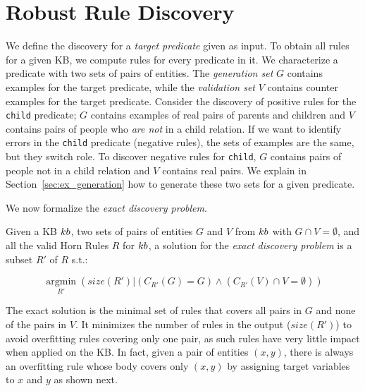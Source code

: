 \section{Robust Rule Discovery} \label{sec:problem}
We define the discovery for a {\em target predicate} given as input. 
To obtain all rules for a given KB, %
we compute rules for every predicate in it. %
We characterize a predicate with two sets of pairs of entities.
%
The \emph{generation set} $G$ contains examples for the target predicate, 
while the \emph{validation set} $V$ contains counter examples for the target predicate.
Consider the discovery of positive rules for the {\tt child} predicate; $G$ contains examples of real pairs of parents and children and $V$ contains pairs of people who {\em are not} in a child relation. If we want to identify errors in the {\tt child} predicate (negative rules), the sets of examples are the same, but they switch role. To discover negative rules for {\tt child}, $G$ contains pairs of people not in a child relation and $V$ contains real pairs.
We explain in Section~\ref{sec:ex_generation} how to generate these two sets for a given predicate. 

We now formalize the \emph{exact discovery problem}. %

\begin{definition}
	Given a KB ${\sc kb}$, two sets of pairs of entities $G$ and $V$ from ${\sc kb}$ with $G \cap V = \emptyset$, and all the valid Horn Rules $R$ for ${\sc kb}$, a solution for the \emph{exact discovery problem} is a subset $R'$ of $R$  s.t.:
	
	\vspace{-4mm}	
	\begin{equation*}
		\underset{R'}{\operatorname{argmin}}(size(R') | (C_{R'}(G) = G) \wedge (C_{R'}(V) \cap V = \emptyset))	\end{equation*}
	\end{definition}
	\vspace{-1ex}	

The exact solution is the minimal set of rules that covers all pairs in $G$ and none of the pairs in $V$. It minimizes the number of rules in the output ($size(R')$) to avoid overfitting rules covering only one pair, as such rules %
have very little impact when applied on the KB. In fact, given a pair of entities $(x,y)$, there is always an overfitting rule whose body covers only $(x,y)$ by assigning target variables to $x$ and $y$ as shown next. %


